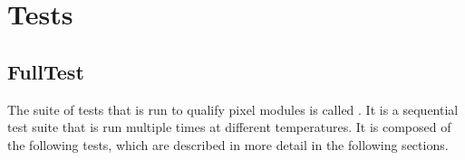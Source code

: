 \section{Tests}
\label{s:tests}


\subsection{FullTest}
\label{ss:fulltest}

The suite of tests that is run to qualify pixel modules is called
\fulltest. It is a sequential test suite that is run multiple times at
different temperatures. It is composed of the following tests, which
are described in more detail in the following sections.

